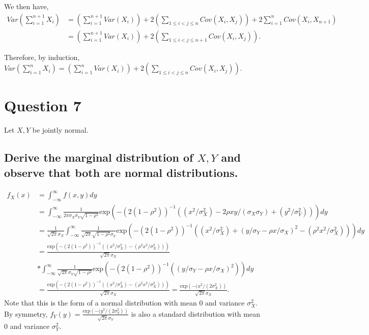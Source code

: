 \documentclass[11pt]{article} %
\begin{document}
We then have,
\begin{align*}
Var\left( \sum_{i=1}^{n+1}X_i\right) &= \left( \sum_{i=1}^{n+1} Var(X_i)\right) +  2\left( \sum_{1\leq i < j \leq n} Cov(X_i,X_j)\right) + 2\sum_{i=1}^{n}Cov\left( X_i,X_{n+1}\right)\\
&=  \left( \sum_{i=1}^{n+1} Var(X_i)\right) +  2\left( \sum_{1\leq i < j \leq n+1} Cov(X_i,X_j)\right).
\end{align*}

Therefore, by induction, $Var\left( \sum_{i=1}^{n}X_i\right) =  \left( \sum_{i=1}^{n} Var(X_i)\right) +  2\left( \sum_{1\leq i < j \leq n} Cov(X_i,X_j)\right)$.

\section{Question 7}
Let $X,Y$ be jointly normal.
\subsection{Derive the marginal distribution of $X,Y$ and observe that both are normal distributions.}
\begin{align*}
f_X(x) &= \int_{-\infty}^{\infty}f(x,y)dy \\ &=\int_{-\infty}^{\infty}\frac{1}{2\pi\sigma_X\sigma_Y\sqrt{1-\rho^2}}\text{exp}\left( -(2(1-\rho^2))^{-1}((x^2/\sigma_X^2) - 2\rho xy/(\sigma_X\sigma_Y) + (y^2/\sigma_Y^2))\right) dy \\
&= \frac{1}{\sqrt{2\pi}\sigma_X}\int_{-\infty}^{\infty}\frac{1}{\sqrt{2\pi}\sqrt{1-\rho^2}\sigma_Y}\text{exp}\left( -(2(1-\rho^2))^{-1}((x^2/\sigma_X^2) + (y/\sigma_Y - \rho x/\sigma_X)^2 - (\rho^2x^2/\sigma_X^2))\right) dy \\
&= \frac{\text{exp}\left(  -(2(1-\rho^2))^{-1}((x^2/\sigma_X^2) -  (\rho^2x^2/\sigma_X^2))\right)}{\sqrt{2\pi}\sigma_X} \\
&*\int_{-\infty}^{\infty}\frac{1}{\sqrt{2\pi}\sigma_Y\sqrt{1-\rho^2}}\text{exp}\left( -(2(1-\rho^2))^{-1}( (y/\sigma_Y - \rho x/\sigma_X)^2 )\right) dy\\
&= \frac{\text{exp}\left(  -(2(1-\rho^2))^{-1}((x^2/\sigma_X^2) -  (\rho^2x^2/\sigma_X^2))\right)}{\sqrt{2\pi}\sigma_X} = \frac{\text{exp}\left(  -(x^2/(2\sigma_X^2)\right)}{\sqrt{2\pi}\sigma_X}  .
\end{align*}
Note that this is the form of a normal distribution with mean $0$ and variance $\sigma_X^2$. By symmetry, $f_{Y}(y) =  \frac{\text{exp}\left(  -(y^2/(2\sigma_Y^2)\right)}{\sqrt{2\pi}\sigma_Y} $ is also a standard distribution with mean 0 and variance $\sigma_Y^2.$
\end{document}
